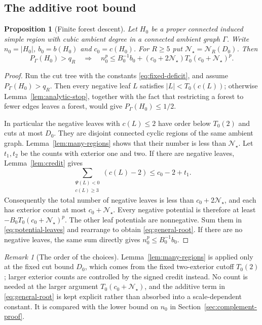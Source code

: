 \documentclass[11pt,a4paper]{article}
\numberwithin{equation}{section}
\newtheorem{proposition}[theorem]{Proposition}
\theoremstyle{definition}
\theoremstyle{remark}
\newtheorem{remark}[theorem]{Remark}
\begin{document}
\subsection{The additive root bound}
\begin{proposition}[Finite forest descent]\label{prop:descent}
Let $H_0$ be a proper connected induced simple region with cubic ambient degree in a connected ambient graph $\Gamma$. Write $n_0=|H_0|$, $b_0=b(H_0)$ and $c_0=c(H_0)$. For $R\ge5$ put $\mathcal N_\star=\mathcal N_R(D_0)$. Then
\begin{equation}\label{eq:general-root}
 P_\Gamma(H_0)>q_R
 \quad\Longrightarrow\quad
 n_0^p\le B_0^{-1}b_0+(c_0+2\mathcal N_\star)T_0(c_0+\mathcal N_\star)^p.
\end{equation}
\end{proposition}
\begin{proof}
Run the cut tree with the constants \eqref{eq:fixed-deficit}, and assume $P_\Gamma(H_0)>q_R$. Then every negative leaf $L$ satisfies $|L|<T_0(c(L))$; otherwise Lemma~\ref{lem:analytic-stop}, together with the fact that restricting a forest to fewer edges leaves a forest, would give $P_\Gamma(H_0)\le1/2$.

In particular the negative leaves with $c(L)\le2$ have order below $T_0(2)$ and cuts at most $D_0$. They are disjoint connected cyclic regions of the same ambient graph. Lemma~\ref{lem:many-regions} shows that their number is less than $\mathcal N_\star$. Let $t_1,t_2$ be the counts with exterior one and two. If there are negative leaves, Lemma~\ref{lem:credit} gives
\[
 \sum_{\substack{\Psi(L)<0\\c(L)\ge3}}(c(L)-2)\le c_0-2+t_1.
\]
Consequently the total number of negative leaves is less than $c_0+2\mathcal N_\star$, and each has exterior count at most $c_0+\mathcal N_\star$. Every negative potential is therefore at least $-B_0T_0(c_0+\mathcal N_\star)^p$. The other leaf potentials are nonnegative. Sum them in \eqref{eq:potential-leaves} and rearrange to obtain \eqref{eq:general-root}. If there are no negative leaves, the same sum directly gives $n_0^p\le B_0^{-1}b_0$.
\end{proof}

\begin{remark}[The order of the choices]
Lemma~\ref{lem:many-regions} is applied only at the fixed cut bound $D_0$, which comes from the fixed two-exterior cutoff $T_0(2)$; larger exterior counts are controlled by the signed credit instead. No count is needed at the larger argument $T_0(c_0+\mathcal N_\star)$, and the additive term in \eqref{eq:general-root} is kept explicit rather than absorbed into a scale-dependent constant. It is compared with the lower bound on $n_0$ in Section~\ref{sec:complement-proof}.
\end{remark}
\end{document}
